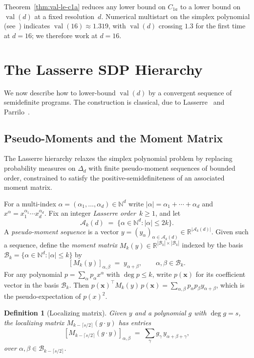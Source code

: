 \documentclass[11pt, letterpaper]{article}
\theoremstyle{paperplain}
\theoremstyle{paperdef}
\newtheorem{definition}[theorem]{Definition}
\newcommand{\R}{\mathbb{R}}
\newcommand{\N}{\mathbb{N}}
\newcommand{\val}{\operatorname{val}}
\begin{document}
Theorem~\ref{thm:val-le-c1a} reduces any lower bound on $C_{1a}$ to
a lower bound on $\val(d)$ at a fixed resolution~$d$.  Numerical
multistart on the simplex polynomial (see~\cite{BajajCS2026})
indicates $\val(16)\approx 1.319$, with $\val(d)$ crossing $1.3$ for
the first time at $d=16$; we therefore work at $d=16$.


\section{The Lasserre SDP Hierarchy}\label{sec:lasserre}

We now describe how to lower-bound $\val(d)$ by a convergent sequence
of semidefinite programs.  The construction is classical, due to
Lasserre~\cite{Lasserre2001,Lasserre2015} and Parrilo~\cite{Parrilo03}.

\subsection{Pseudo-Moments and the Moment Matrix}

The Lasserre hierarchy relaxes the simplex polynomial problem by
replacing probability measures on $\Delta_d$ with finite
pseudo-moment sequences of bounded order, constrained to satisfy the
positive-semidefiniteness of an associated moment matrix.

For a multi-index $\alpha=(\alpha_1,\ldots,\alpha_d)\in\N^d$ write
$|\alpha|=\alpha_1+\cdots+\alpha_d$ and $x^\alpha =
x_1^{\alpha_1}\cdots x_d^{\alpha_d}$.  Fix an integer
\emph{Lasserre order}~$k\ge 1$, and let
\[
  \mathcal{A}_k(d) \;=\; \{\alpha\in\N^d:|\alpha|\le 2k\}.
\]
A \emph{pseudo-moment sequence} is a vector
$y=(y_\alpha)_{\alpha\in\mathcal{A}_k(d)}\in\R^{|\mathcal{A}_k(d)|}$.
Given such a sequence, define the \emph{moment matrix}
$M_k(y)\in\R^{|\mathcal{B}_k|\times|\mathcal{B}_k|}$ indexed by the
basis $\mathcal{B}_k=\{\alpha\in\N^d:|\alpha|\le k\}$ by
\[
  [M_k(y)]_{\alpha,\beta} \;=\; y_{\alpha+\beta},
  \qquad \alpha,\beta\in\mathcal{B}_k.
\]
For any polynomial $p=\sum_\alpha p_\alpha x^\alpha$ with
$\deg p\le k$, write $p(\mathbf{x})$ for its coefficient vector in the
basis $\mathcal{B}_k$.  Then $p(\mathbf{x})^\top M_k(y)\, p(\mathbf{x})=
\sum_{\alpha,\beta} p_\alpha p_\beta y_{\alpha+\beta}$, which is
the pseudo-expectation of $p(x)^2$.

\begin{definition}[Localizing matrix]\label{def:localizing}
Given $y$ and a polynomial $g$ with $\deg g=s$, the
\emph{localizing matrix} $M_{k-\lceil s/2\rceil}(g\cdot y)$ has entries
\[
  [M_{k-\lceil s/2\rceil}(g\cdot y)]_{\alpha,\beta}
  \;=\;
  \sum_\gamma g_\gamma\, y_{\alpha+\beta+\gamma},
\]
over $\alpha,\beta\in\mathcal{B}_{k-\lceil s/2\rceil}$.
\end{definition}
\end{document}
